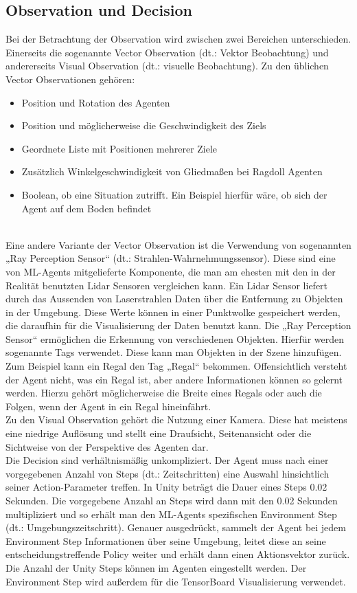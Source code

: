 \subsection{Observation und Decision}
\label{observation}
Bei der Betrachtung der Observation wird zwischen zwei Bereichen unterschieden. Einerseits die sogenannte Vector Observation (dt.: Vektor Beobachtung) und andererseits Visual Observation (dt.: visuelle Beobachtung). Zu den üblichen Vector Observationen gehören:
\\
\begin{itemize}
	\item Position und Rotation des Agenten
	\item Position und möglicherweise die Geschwindigkeit des Ziels
	\item Geordnete Liste mit Positionen mehrerer Ziele
	\item Zusätzlich Winkelgeschwindigkeit von Gliedmaßen bei Ragdoll Agenten
	\item Boolean, ob eine Situation zutrifft. Ein Beispiel hierfür wäre, ob sich der Agent auf dem Boden befindet
\end{itemize}
\noindent
\\
Eine andere Variante der Vector Observation ist die Verwendung von sogenannten „Ray Perception Sensor“ (dt.: Strahlen-Wahrnehmungssensor). Diese sind eine von ML-Agents mitgelieferte Komponente, die man am ehesten mit den in der Realität benutzten Lidar Sensoren vergleichen kann. Ein Lidar Sensor liefert durch das Aussenden von Laserstrahlen Daten über die Entfernung zu Objekten in der Umgebung. Diese Werte können in einer Punktwolke gespeichert werden, die daraufhin für die Visualisierung der Daten benutzt kann. Die „Ray Perception Sensor“ ermöglichen die Erkennung von verschiedenen Objekten. Hierfür werden sogenannte Tags verwendet. Diese kann man Objekten in der Szene hinzufügen. Zum Beispiel kann ein Regal den Tag „Regal“ bekommen. Offensichtlich versteht der Agent nicht, was ein Regal ist, aber andere Informationen können so gelernt werden. Hierzu gehört möglicherweise die Breite eines Regals oder auch die Folgen, wenn der Agent in ein Regal hineinfährt.  
\\
Zu den Visual Observation gehört die Nutzung einer Kamera. Diese hat meistens eine niedrige Auflösung und stellt eine Draufsicht, Seitenansicht oder die Sichtweise von der Perspektive des Agenten dar. 
\\
Die Decision sind verhältnismäßig unkompliziert. Der Agent muss nach einer vorgegebenen Anzahl von Steps (dt.: Zeitschritten) eine Auswahl hinsichtlich seiner Action-Parameter treffen. In Unity beträgt die Dauer eines Steps 0.02 Sekunden. Die vorgegebene Anzahl an Steps wird dann mit den 0.02 Sekunden multipliziert und so erhält man den ML-Agents spezifischen Environment Step (dt.: Umgebungszeitschritt). Genauer ausgedrückt, sammelt der Agent bei jedem Environment Step Informationen über seine Umgebung, leitet diese an seine entscheidungstreffende Policy weiter und erhält dann einen Aktionsvektor zurück. Die Anzahl der Unity Steps können im Agenten eingestellt werden. Der Environment Step wird außerdem für die TensorBoard Visualisierung verwendet.

